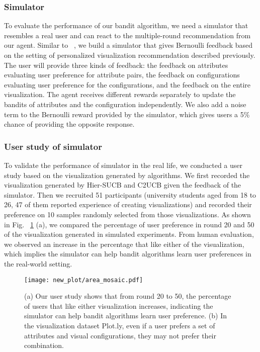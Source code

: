 \subsubsection{Simulator}
To evaluate the performance of our bandit algorithm, we need a simulator that resembles a real user and can react to the multiple-round recommendation from our agent. 
Similar to ~\cite{peng2019practical,zhang2020adaptive}, we build a simulator that gives Bernoulli feedback based on the setting of personalized visualization recommendation described previously. 
The user will provide three kinds of feedback: the feedback on attributes evaluating user preference for attribute pairs, 
the feedback on configurations evaluating user preference for the configurations, and the feedback on the entire visualization. 
The agent receives different rewards separately to update the bandits of attributes and the configuration independently. 
We also add a noise term to the Bernoulli reward provided by the simulator, which gives users a 5\% chance of providing the opposite response.
\subsubsection{User study of simulator}
To validate the performance of simulator in the real life, we conducted a user study based on the visualization generated by algorithms. We first recorded the visualization generated by Hier-SUCB and C2UCB given the feedback of the simulator. Then we recruited 51 participants (university students aged from 18 to 26, 47 of them reported experience of creating visualizations) and recorded their preference on 10 samples randomly selected from those visualizations. As shown in Fig. ~\ref{fig:ustudy_pie} (a), we compared the percentage of user preference in round 20 and 50 of the visualization generated in simulated experiments. From human evaluation, we observed an increase in the percentage that like either of the visualization, which implies the simulator can help bandit algorithms learn user preferences in the real-world setting.
\begin{figure}[b]
    \centering
    \texttt{[image: new\_plot/area\_mosaic.pdf]}
    \caption{(a) Our user study shows that from round 20 to 50, the percentage of users that like either visualization increases, indicating the simulator can help bandit algorithms learn user preference.
    (b) In the visualization dataset Plot.ly, even if a user prefers a set of attributes and visual configurations, they may not prefer their combination.}
    \label{fig:ustudy_pie}
\end{figure}





